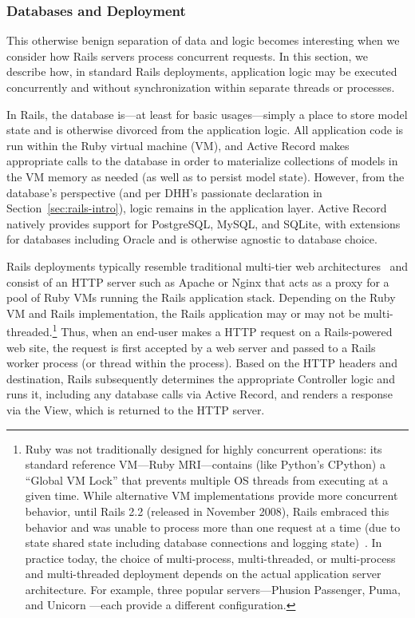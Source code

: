 \subsubsection{Databases and Deployment}
\label{sec:deployment}

This otherwise benign separation of data and logic becomes interesting when we consider how Rails servers process concurrent requests. In this section, we describe how, in standard Rails deployments, application logic may be executed concurrently and without synchronization within separate threads or processes.

In Rails, the database is---at least for basic usages---simply a place to store model state and is otherwise divorced from the application logic. All application code is run within the Ruby virtual machine (VM), and Active Record makes appropriate calls to the database in order to materialize collections of models in the VM memory as needed (as well as to persist model state). However, from the database's perspective (and per DHH's passionate declaration in Section~\ref{sec:rails-intro}), logic remains in the application layer. Active Record natively provides support for PostgreSQL, MySQL, and SQLite, with extensions for databases including Oracle and is otherwise agnostic to database choice.

Rails deployments typically resemble traditional multi-tier web architectures~\cite{alonso-web} and consist of an HTTP server such as Apache or Nginx that acts as a proxy for a pool of Ruby VMs running the Rails application stack. Depending on the Ruby VM and Rails implementation, the Rails application may or may not be multi-threaded.\footnote{Ruby was not traditionally designed for highly concurrent operations: its standard reference VM---Ruby MRI---contains (like Python's CPython) a ``Global VM Lock'' that prevents multiple OS threads from executing at a given time. While alternative VM implementations provide more concurrent behavior, until Rails 2.2 (released in November 2008), Rails embraced this behavior and was unable to process more than one request at a time (due to state shared state including database connections and logging state)~\cite{rails-threading}. In practice today, the choice of multi-process, multi-threaded, or multi-process and multi-threaded deployment depends on the actual application server architecture. For example, three popular servers---Phusion Passenger, Puma, and Unicorn ---each provide a different configuration.} Thus, when an end-user makes a HTTP request on a Rails-powered web site, the request is first accepted by a web server and passed to a Rails worker process (or thread within the process). Based on the HTTP headers and destination, Rails subsequently determines the appropriate Controller logic and runs it, including any database calls via Active Record, and renders a response via the View, which is returned to the HTTP server.

